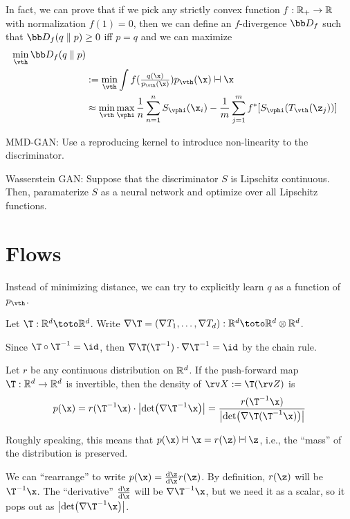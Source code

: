 \documentclass[class=cs480,notes,tikz]{agony}
\begin{document}
\lecture{$\pi$}
In fact, we can prove that if we pick any strictly convex function $f : \mathbb{R}_+ \to \mathbb{R}$
with normalization $f(1) = 0$, then we can define an $f$-divergence $\bb D_f$
such that $\bb D_f (q \parallel p) \geq 0$ iff $p = q$ and we can maximize
\begin{align*}
  \min_{\vth} \bb D_f(q \parallel p)                                                                                            \\
   & := \min_{\vth}\int f(\tfrac{q(\x)}{p_{\vth}(\x)}) p_{\vth}(\x) \dd{\x}                                                     \\
   & \approx \min_{\vth}\max_{\vphi} \frac1n \sum_{n=1}^n S_{\vphi}(\x_i) - \frac1m \sum_{j=1}^m f^*[S_{\vphi}(T_{\vth}(\z_j))]
\end{align*}

MMD-GAN: Use a reproducing kernel to introduce non-linearity to the discriminator.

Wasserstein GAN: Suppose that the discriminator $S$ is Lipschitz continuous.
Then, paramaterize $S$ as a neural network and optimize over all Lipschitz functions.

\section{Flows}

Instead of minimizing distance, we can try to explicitly learn $q$ as a function of $p_{\vth}$.

\begin{remark}
  Let $\T : \R^d \toto \R^d$.
  Write $\nabla\T = (\nabla T_1,\dotsc,\nabla T_d) : \R^d \toto \R^d \otimes \R^d$.

  Since $\T\circ\T^{-1} = \id$,
  then $\nabla\T(\T^{-1})\cdot\nabla\T^{-1} = \id$ by the chain rule.
\end{remark}

\begin{theorem}
  Let $r$ be any continuous distribution on $\mathbb{R}^d$.
  If the push-forward map $\T : \R^d \to \R^d$ is invertible,
  then the density of $\rv X := \T(\rv Z)$ is
  \[
    p(\x) = r(\T^{-1}\x) \cdot \abs{\det(\nabla\T^{-1}\x)}
    = \frac{r(\T^{-1}\x)}{\abs{\det(\nabla\T(\T^{-1}\x))}}
  \]
\end{theorem}
\begin{prf}
  Roughly speaking, this means that $p(\x) \dd{\x} = r(\z) \dd{\z}$, i.e.,
  the ``mass'' of the distribution is preserved.

  We can ``rearrange'' to write $p(\x) = \dv{\z}{\x}r(\z)$.
  By definition, $r(\z)$ will be $\T^{-1}\x$.
  The ``derivative'' $\dv{\z}{\x}$ will be $\nabla \T^{-1}\x$,
  but we need it as a scalar, so it pops out as $\abs{\det(\nabla\T^{-1}\x)}$.
\end{prf}
\end{document}
